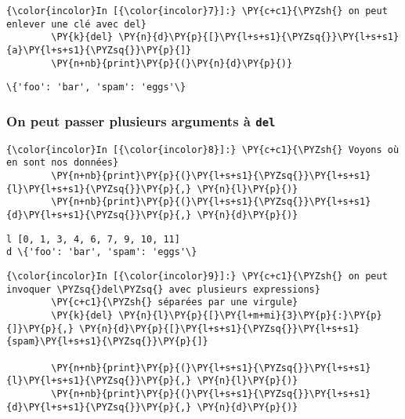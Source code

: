     \begin{Verbatim}[commandchars=\\\{\}]
{\color{incolor}In [{\color{incolor}7}]:} \PY{c+c1}{\PYZsh{} on peut enlever une clé avec del}
        \PY{k}{del} \PY{n}{d}\PY{p}{[}\PY{l+s+s1}{\PYZsq{}}\PY{l+s+s1}{a}\PY{l+s+s1}{\PYZsq{}}\PY{p}{]}
        \PY{n+nb}{print}\PY{p}{(}\PY{n}{d}\PY{p}{)}
\end{Verbatim}


    \begin{Verbatim}[commandchars=\\\{\}]
\{'foo': 'bar', 'spam': 'eggs'\}

    \end{Verbatim}

    \hypertarget{on-peut-passer-plusieurs-arguments-uxe0-del}{%
\subsubsection{\texorpdfstring{On peut passer plusieurs arguments à
\texttt{del}}{On peut passer plusieurs arguments à del}}\label{on-peut-passer-plusieurs-arguments-uxe0-del}}

    \begin{Verbatim}[commandchars=\\\{\}]
{\color{incolor}In [{\color{incolor}8}]:} \PY{c+c1}{\PYZsh{} Voyons où en sont nos données}
        \PY{n+nb}{print}\PY{p}{(}\PY{l+s+s1}{\PYZsq{}}\PY{l+s+s1}{l}\PY{l+s+s1}{\PYZsq{}}\PY{p}{,} \PY{n}{l}\PY{p}{)}
        \PY{n+nb}{print}\PY{p}{(}\PY{l+s+s1}{\PYZsq{}}\PY{l+s+s1}{d}\PY{l+s+s1}{\PYZsq{}}\PY{p}{,} \PY{n}{d}\PY{p}{)}
\end{Verbatim}


    \begin{Verbatim}[commandchars=\\\{\}]
l [0, 1, 3, 4, 6, 7, 9, 10, 11]
d \{'foo': 'bar', 'spam': 'eggs'\}

    \end{Verbatim}

    \begin{Verbatim}[commandchars=\\\{\}]
{\color{incolor}In [{\color{incolor}9}]:} \PY{c+c1}{\PYZsh{} on peut invoquer \PYZsq{}del\PYZsq{} avec plusieurs expressions}
        \PY{c+c1}{\PYZsh{} séparées par une virgule}
        \PY{k}{del} \PY{n}{l}\PY{p}{[}\PY{l+m+mi}{3}\PY{p}{:}\PY{p}{]}\PY{p}{,} \PY{n}{d}\PY{p}{[}\PY{l+s+s1}{\PYZsq{}}\PY{l+s+s1}{spam}\PY{l+s+s1}{\PYZsq{}}\PY{p}{]}
        
        \PY{n+nb}{print}\PY{p}{(}\PY{l+s+s1}{\PYZsq{}}\PY{l+s+s1}{l}\PY{l+s+s1}{\PYZsq{}}\PY{p}{,} \PY{n}{l}\PY{p}{)}
        \PY{n+nb}{print}\PY{p}{(}\PY{l+s+s1}{\PYZsq{}}\PY{l+s+s1}{d}\PY{l+s+s1}{\PYZsq{}}\PY{p}{,} \PY{n}{d}\PY{p}{)}
\end{Verbatim}


